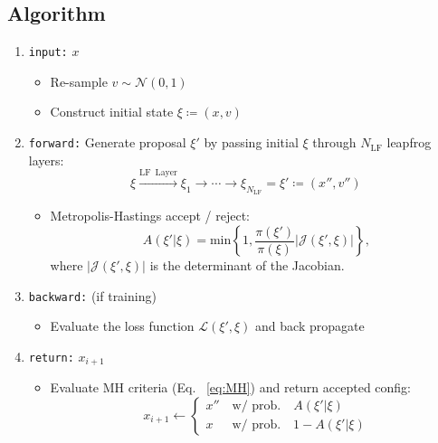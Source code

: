 \documentclass[a4paper,11pt]{article}
\begin{document}
\subsection{\label{subsec:algorithm}Algorithm}
\begin{enumerate}
    \item \texttt{input:} $x$
    \begin{itemize}
        \item Re-sample $v \sim \mathcal{N}(0, 1)$
        \item Construct initial state $\xi \coloneqq (x, v)$
    \end{itemize}
    \item \texttt{forward:} Generate proposal $\xi'$ by passing initial $\xi$ through $N_{\mathrm{LF}}$ leapfrog layers:
    \begin{equation}
        \xi \xrightarrow[]{\mathrm{LF\,\,\, Layer}} \xi_{1} \rightarrow \cdots \rightarrow \xi_{N_{\mathrm{LF}}} = \xi' \coloneqq (x'', v'')
    \end{equation}
    \begin{itemize}
        \item Metropolis-Hastings accept / reject:
        \begin{equation}
            A(\xi'|\xi) = \mathrm{min}\left\{1, \frac{\pi(\xi')}{\pi(\xi)} \left|\mathcal{J}\left(\xi', \xi\right)\right|\right\},
            \label{eq:MH}
        \end{equation}
        where $\left|\mathcal{J}(\xi',\xi)\right|$ is the determinant of the Jacobian.
    \end{itemize}
    \item \texttt{backward:} (if training)
    \begin{itemize}
        \item Evaluate the loss function $\mathcal{L}(\xi', \xi)$ and back propagate
    \end{itemize}
    \item \texttt{return:} $x_{i+1}$
    \begin{itemize}
        \item Evaluate MH criteria (Eq. ~\ref{eq:MH}) and return accepted config:
        \begin{equation}
            x_{i+1} \gets \begin{cases}
                x'' \quad \text{w/ prob.}\quad A(\xi'|\xi)  \\
                x \,\,\,\quad \text{w/ prob.} \quad 1 - A(\xi'|\xi)
            \end{cases}
        \end{equation}
    \end{itemize}
\end{enumerate}
%
\end{document}
